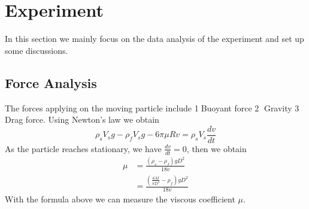 \documentclass{report}
\begin{document}
\section{Experiment}
In this section we mainly focus on the data analysis of the experiment and set up some discussions.
\subsection{Force Analysis}
The forces applying on the moving particle include \textcircled{\small1}Buoyant force \textcircled{\small2} Gravity \textcircled{\small3} Drag force. Using Newton's law we obtain
\begin{equation}
    \rho_s V_s g - \rho_f V_s g - 6\pi \mu R v = \rho_s V_s \frac{dv}{dt}
\end{equation}
As the particle reaches stationary, we have $\frac{dv}{dt} = 0$, then we obtain
\begin{equation}
\begin{aligned}
    \mu &= \frac{(\rho_s - \rho_f )gD^2}{18v} \\
    & = \frac{(\frac{6M}{\pi D^3} - \rho_f)gD^2}{18v}
\end{aligned}
\end{equation}
With the formula above we can measure the viscous coefficient $\mu$.
\end{document}
